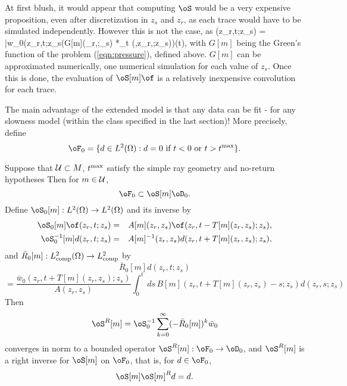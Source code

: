 At first blush, it would appear that computing $\oS$ would be a very
expensive proposition, even after discretization in $z_s$ and $z_r$,
as each trace would have to be simulated independently. However this
is not the case, as \be\label{eqn:extgreen} \oS[m]\of(z_r,t;z_s) =
\bar{w}_0(z_r,t;z_s(G[m](\bx_r,\cdot;\bx_s) *_t \of(,z_r,\cdot;z_s))(t), \ee
with $G[m]$ being the Green's function of the problem
(\ref{eqn:pressure}), defined above. $G[m]$ can be approximated
numerically, one numerical simulation for each value of $z_s$. Once
this is done, the evaluation of $\oS[m]\of$ is a relatively
inexpensive convolution for each trace.

The main advantage of the extended model is that any data can be fit -
for any slowness model (within the class specified in the last
section)! More precisely, define 
\begin{equation}
\label{eqn:extrange}
\oF_0 = \{d \in L^2(\Omega): d=0 \mbox{ if } t<0 \mbox{ or } t>t^{\rm 
  max} \}. 
\end{equation}
\begin{theorem}
\label{thm:extsur}
Suppose that ${\cal U} \subset M$, $t^{\rm max}$ satisfy the simple 
ray geometry and no-return hypotheses
Then for $m \in {\cal U}$,
\begin{equation}
\label{eqn:extsur}
\oF_0 \subset \oS[m]\oD_0.
\end{equation}
Define $\oS_0[m]: L^2(\Omega) \rightarrow L^2(\Omega)$ and its inverse by
\begin{eqnarray}
\label{eqn:approxrinv}
\oS_0[m]\of(z_r,t;z_s) & = &
A[m](z_r,z_s)\of(z_r,t-T[m](z_r,z_s);z_s),\nonumber\\
\oS_0^{-1}[m]d(z_r,t;z_s) &=&
A[m]^{-1}(z_r,z_s)d(z_r,t+T[m](z_r,z_s);z_s),
\end{eqnarray}
and $\bar{R}_0[m]: L^2_{\rm comp}(\Omega) \rightarrow L^2_{\rm comp}$
by
\[
\bar{R}_0[m]d(z_r,t;z_s) 
\]
\begin{equation}
\label{eqn:approxres}
= \frac{\bar{w}_0(z_r,t+T[m](z_r,z_s);z_s)}{A(z_r,z_s)}
\int_0^t\,ds\,B[m](z_r,t+T[m](z_r,z_s)-s;z_s)d(z_r,s;z_s)
\end{equation}
Then 
\begin{equation}
\label{eqn:rinvdef}
\oS^R[m] = \oS_0^{-1}
\sum_{k=0}^{\infty}(-\bar{R}_0[m])^k \bar{w}_0
\end{equation}
converges in norm to a bounded operator $\oS^R[m]: \oF_0
\rightarrow \oD_0$, and $\oS^R[m]$ is a right inverse
for $\oS[m]$ on $\oF_0$, that is, for $d \in \oF_0$,
\begin{equation}
\label{eqn:invreln}
\oS[m]\oS[m]^Rd = d.
\end{equation}
\end{theorem}

